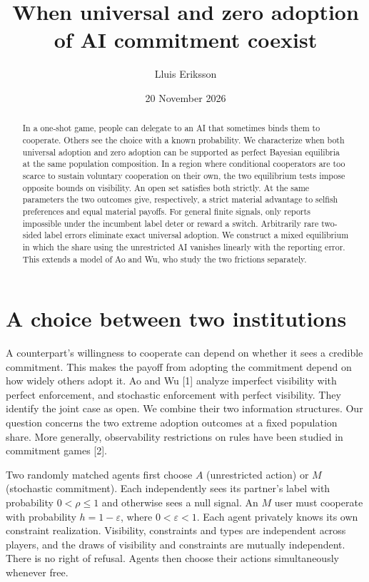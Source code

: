 \documentclass[11pt]{article}
\title{When universal and zero adoption of AI commitment coexist}
\author{Lluis Eriksson}
\date{20 November 2026}
\begin{document}
\maketitle
\begin{abstract}
In a one-shot game, people can delegate to an AI that sometimes binds them to cooperate. Others see the choice with a known probability. We characterize when both universal adoption and zero adoption can be supported as perfect Bayesian equilibria at the same population composition. In a region where conditional cooperators are too scarce to sustain voluntary cooperation on their own, the two equilibrium tests impose opposite bounds on visibility. An open set satisfies both strictly. At the same parameters the two outcomes give, respectively, a strict material advantage to selfish preferences and equal material payoffs. For general finite signals, only reports impossible under the incumbent label deter or reward a switch. Arbitrarily rare two-sided label errors eliminate exact universal adoption. We construct a mixed equilibrium in which the share using the unrestricted AI vanishes linearly with the reporting error. This extends a model of Ao and Wu, who study the two frictions separately.
\end{abstract}

\section{A choice between two institutions}
A counterpart's willingness to cooperate can depend on whether it sees a credible commitment. This makes the payoff from adopting the commitment depend on how widely others adopt it. Ao and Wu [1] analyze imperfect visibility with perfect enforcement, and stochastic enforcement with perfect visibility. They identify the joint case as open. We combine their two information structures. Our question concerns the two extreme adoption outcomes at a fixed population share. More generally, observability restrictions on rules have been studied in commitment games [2].

Two randomly matched agents first choose $A$ (unrestricted action) or $M$ (stochastic commitment). Each independently sees its partner's label with probability $0<\rho\le1$ and otherwise sees a null signal. An $M$ user must cooperate with probability $h=1-\varepsilon$, where $0<\varepsilon<1$. Each agent privately knows its own constraint realization. Visibility, constraints and types are independent across players, and the draws of visibility and constraints are mutually independent. There is no right of refusal. Agents then choose their actions simultaneously whenever free.
\end{document}
